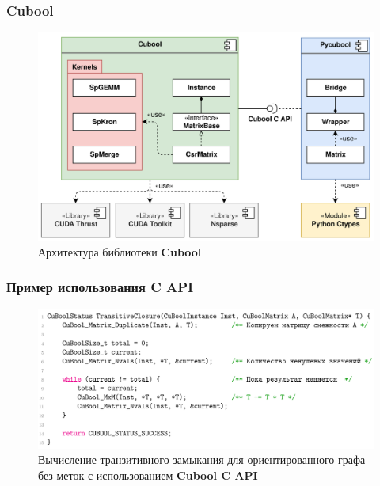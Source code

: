 \documentclass[xcolor=table,english]{beamer}
\begin{document}
\begin{frame}[fragile] \frametitle{Cubool}
    \begin{center}
    \begin{minipage}[m]{0.85\linewidth}
        \begin{figure}
            \centering
            \includegraphics[width=\textwidth]{figures/lib_architecture.png}
            \caption{Архитектура библиотеки \textbf{Cubool}}
        \end{figure}
    \end{minipage}\hfill    
    \end{center}
\end{frame}

\begin{frame}[fragile] \frametitle{Пример использования C API}
    \begin{center} 
    \begin{minipage}[m]{0.85\linewidth}
        \begin{figure}
            \centering
            \includegraphics[width=\textwidth]{figures/tc_c_api.png}
            \caption{Вычисление транзитивного замыкания для ориентированного графа без меток с использованием \textbf{Cubool C API}}
        \end{figure}
    \end{minipage}\hfill    
    \end{center}   
\end{frame}
\end{document}
